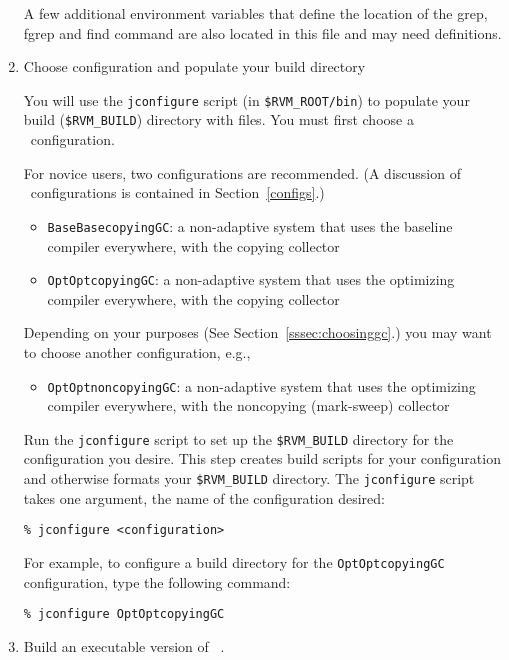 \begin{enumerate}
A few additional environment variables that define the location of
the grep, fgrep and find command are also located in this file and
may need definitions.


\item Choose configuration and populate your build directory

You will use the {\tt jconfigure} script (in {\tt \$RVM\_ROOT/bin}) to
populate your build ({\tt \$RVM\_BUILD}) directory with files.  You must
first choose a \jp\ configuration.

For novice users, two configurations are recommended.  (A discussion
of \jp\ configurations is contained in Section~\ref{configs}.)

\begin{itemize}
\item {\tt BaseBasecopyingGC}: a non-adaptive system that uses the
baseline  compiler everywhere, with the copying collector
\item {\tt OptOptcopyingGC}: a non-adaptive system that uses the
optimizing compiler everywhere, with the copying collector
\end{itemize}

Depending on your purposes (See Section~\ref{sssec:choosinggc}.) you
may want to choose another configuration, e.g.,
\begin{itemize}
\item {\tt OptOptnoncopyingGC}: a non-adaptive system that uses the
optimizing  compiler everywhere, with the noncopying (mark-sweep) collector
\end{itemize}

Run the {\tt jconfigure} script to set up the {\tt \$RVM\_BUILD}
directory for the configuration you desire.  This step creates
build scripts for your configuration and otherwise formats your
{\tt \$RVM\_BUILD} directory.
The {\tt jconfigure} script takes one argument, the name of the
configuration desired: 

\begin{verbatim}
% jconfigure <configuration>
\end{verbatim}

For example, to configure a build 
directory for the {\tt OptOptcopyingGC} configuration, type
the following command:

\begin{verbatim}
% jconfigure OptOptcopyingGC
\end{verbatim}

\item Build an executable version of \jp\ .  


\end{enumerate}
